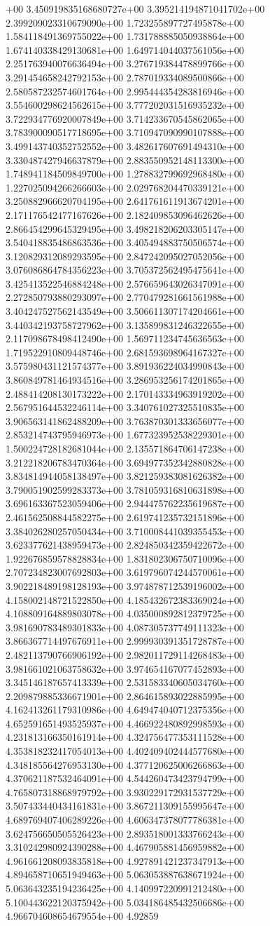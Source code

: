 +00	3.450919835168680727e+00	3.395214194871041702e+00	2.399209023310679090e+00	1.723255897727495878e+00	1.584118491369755022e+00	1.731788885050938864e+00	1.674140338429130681e+00	1.649714044037561056e+00	2.251763940076636494e+00	3.276719384478899766e+00	3.291454658242792153e+00	2.787019334089500866e+00	2.580587232574601764e+00	2.995444354283816946e+00	3.554600298624562615e+00	3.777202031516935232e+00	3.722934776920007849e+00	3.714233670545862065e+00	3.783900090517718695e+00	3.710947090990107888e+00	3.499143740352752552e+00	3.482617607691494310e+00	3.330487427946637879e+00	2.883550952148113300e+00	1.748941184509849700e+00	1.278832799692968480e+00	1.227025094266266603e+00	2.029768204470339121e+00	3.250882966620704195e+00	2.641761611913674201e+00	2.171176542477167626e+00	2.182409853096462626e+00	2.866454299645329495e+00	3.498218206203305147e+00	3.540418835486863536e+00	3.405494883750506574e+00	3.120829312089293595e+00	2.847242095027052056e+00	3.076086864784356223e+00	3.705372562495475641e+00	3.425413522546884248e+00	2.576659643026347091e+00	2.272850793880293097e+00	2.770479281661561988e+00	3.404247527562143549e+00	3.506611307174204661e+00	3.440342193758727962e+00	3.135899831246322655e+00	2.117098678498412490e+00	1.569711234745636563e+00	1.719522910809448746e+00	2.681593698964167327e+00	3.575980431121574377e+00	3.891936224034990843e+00	3.860849781464934516e+00	3.286953256174201865e+00	2.488414208130173222e+00	2.170143334963919202e+00	2.567951644532246114e+00	3.340761027325510835e+00	3.906563141862488209e+00	3.763870301333656077e+00	2.853214743795946973e+00	1.677323952538229301e+00	1.500224728182681044e+00	2.135571864706147238e+00	3.212218206783470364e+00	3.694977352342880828e+00	3.834814944058138497e+00	3.821259383081626382e+00	3.790051902599283373e+00	3.781059316810631898e+00	3.696163367523059406e+00	2.944475762235619687e+00	2.461562508844582275e+00	2.619741235732151896e+00	3.384026280257050434e+00	3.710008441039355453e+00	3.623377621438959473e+00	2.824850342359422672e+00	1.922676859578828834e+00	1.831802306750710096e+00	2.707234823007692803e+00	3.619796074244570061e+00	3.902218489198128193e+00	3.974878712539196002e+00	4.158002148721522850e+00	4.185432672383369024e+00	4.108809164889803078e+00	4.035000892812379725e+00	3.981690783489301833e+00	4.087305737749111323e+00	3.866367714497676911e+00	2.999930391351728787e+00	2.482113790766906192e+00	2.982011729114268483e+00	3.981661021063758632e+00	3.974654167077452893e+00	3.345146187657413339e+00	2.531583340605034760e+00	2.209879885336671901e+00	2.864615893022885995e+00	4.162413261179310986e+00	4.649474040712375356e+00	4.652591651493525937e+00	4.466922480892998593e+00	4.231813166350161914e+00	4.324756477353111528e+00	4.353818232417054013e+00	4.402409402444577680e+00	4.348185564276953130e+00	4.377120625006266863e+00	4.370621187532464091e+00	4.544260473423794799e+00	4.765807318868979792e+00	3.930229172931537729e+00	3.507433440434161831e+00	3.867211309155995647e+00	4.689769407406289226e+00	4.606347378077786381e+00	3.624756650505526423e+00	2.893518001333766243e+00	3.310242980924390288e+00	4.467905881456959882e+00	4.961661208093835818e+00	4.927891421237347913e+00	4.894658710651949463e+00	5.063053887638671924e+00	5.063643235194236425e+00	4.140997220991212480e+00	5.100443622120375942e+00	5.034186485432506686e+00	4.966704608654679554e+00	4.92859